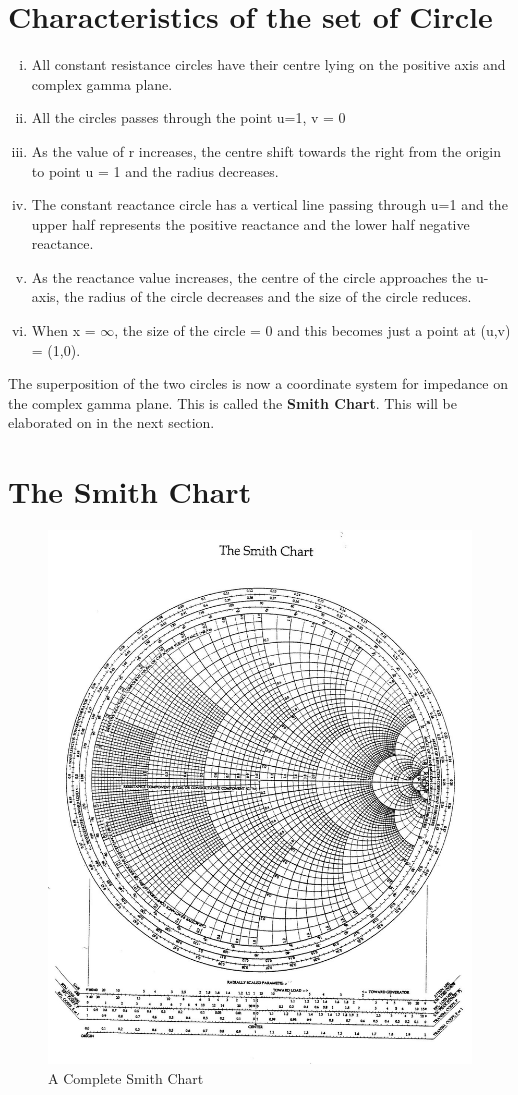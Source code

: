 \section{Characteristics of the set of Circle}
\begin{enumerate}[(i)]
\item All constant resistance circles have their centre lying on the positive axis and complex gamma plane.
\item All the circles passes through the point u=1, v = 0
\item As the value of r increases, the centre shift towards the right from the origin to point u = 1 and the radius decreases.
\item The constant reactance circle has a vertical line passing through u=1 and the upper half represents the positive reactance and the lower half negative reactance.
\item As the reactance value increases, the centre of the circle approaches the u-axis, the radius of the circle decreases and the size of the circle reduces.
\item When x = $\infty$, the size of the circle = 0  and this  becomes just a point at (u,v) = (1,0).
\end{enumerate}

The superposition of the two circles is now a coordinate system for impedance on the complex gamma plane. This is called the \textbf{Smith Chart}.  This will be elaborated on in  the next section.
\section{\textbf{The Smith Chart}}
\begin{figure}[h]
\centering
\includegraphics[width=0.7\linewidth]{"./graphics/smith_chart (2)"}
\caption{A Complete Smith Chart}
\label{fig:smithchart-2}
\end{figure}

